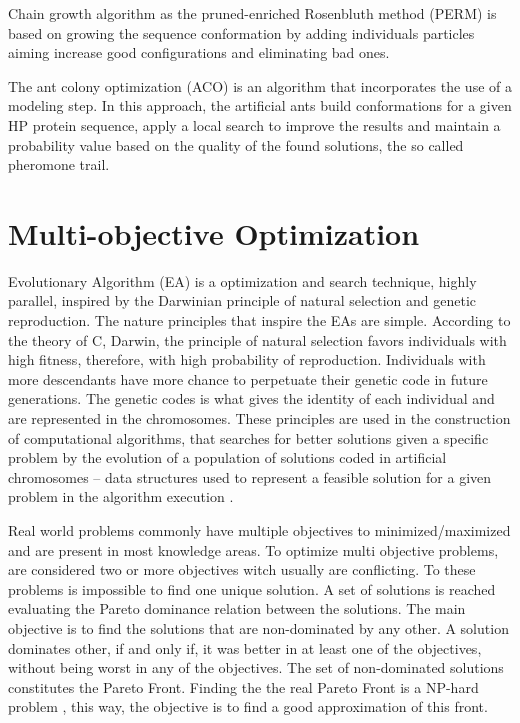 Chain growth algorithm as the pruned-enriched Rosenbluth method (PERM) \cite{} is based on growing the sequence conformation by adding individuals particles aiming increase good configurations and eliminating bad ones.

The ant colony optimization (ACO) \cite{} is an algorithm that incorporates the use of a modeling step. In this approach, the artificial ants build conformations for a given HP protein sequence, apply a local search to improve the results and maintain a probability value based on the quality of the found solutions, the so called pheromone trail.

\section{Multi-objective Optimization} \label{sec:optimization}


Evolutionary Algorithm (EA) is a optimization and search technique, highly parallel, inspired by the Darwinian principle of natural selection and genetic reproduction. The nature principles that inspire the EAs are simple. According to the theory of C, Darwin, the principle of natural selection favors individuals with high fitness, therefore, with high probability of reproduction. Individuals with more descendants have more chance to perpetuate their genetic code in future generations. The genetic codes is what gives the identity of each individual and are represented in the chromosomes. These principles are used in the construction of computational algorithms, that searches for better solutions given a specific problem by the evolution of a population of solutions coded in artificial chromosomes -- data structures used to represent a feasible solution for a given problem in the algorithm execution \cite{pacheco1999algoritmos}.


Real world problems commonly have multiple objectives to minimized/maximized and are present in most knowledge areas. To optimize multi objective problems, are considered two or more objectives witch usually are conflicting. To these problems is impossible to find one unique solution. A set of solutions is reached evaluating the Pareto dominance relation \cite{pareto} between the solutions. The main objective is to find the solutions that are non-dominated by any other. A solution dominates other, if and only if, it was better in at least one of the objectives, without being worst in any of the objectives. The set of non-dominated solutions constitutes the Pareto Front. Finding the the real Pareto Front is a NP-hard problem \cite{fonseca2005tutorial}, this way, the objective is to find a good approximation of this front.


